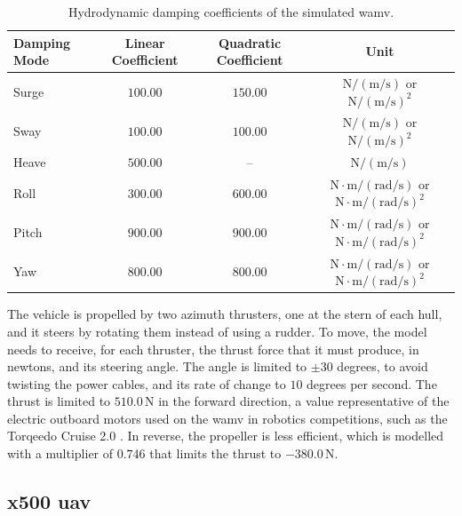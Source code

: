 \begin{table}[htbp]
    \centering
    \caption{Hydrodynamic damping coefficients of the simulated \gls{wamv}.}
    \label{tab:usv_damping_parameters}
    \begin{tabular}{lccc}
        \toprule
        \textbf{Damping Mode} & \textbf{Linear Coefficient} & \textbf{Quadratic Coefficient} & \textbf{Unit} \\
        \midrule
        Surge & $100.00$ & $150.00$ & $\text{N}/(\text{m/s})$ or $\text{N}/(\text{m/s})^2$ \\
        Sway & $100.00$ & $100.00$ & $\text{N}/(\text{m/s})$ or $\text{N}/(\text{m/s})^2$ \\
        Heave & $500.00$ & -- & $\text{N}/(\text{m/s})$ \\
        Roll & $300.00$ & $600.00$ & $\text{N}\cdot\text{m}/(\text{rad/s})$ or $\text{N}\cdot\text{m}/(\text{rad/s})^2$ \\
        Pitch & $900.00$ & $900.00$ & $\text{N}\cdot\text{m}/(\text{rad/s})$ or $\text{N}\cdot\text{m}/(\text{rad/s})^2$ \\
        Yaw & $800.00$ & $800.00$ & $\text{N}\cdot\text{m}/(\text{rad/s})$ or $\text{N}\cdot\text{m}/(\text{rad/s})^2$ \\
        \bottomrule
    \end{tabular}
\end{table}

The vehicle is propelled by two azimuth thrusters, one at the stern of each hull, and it steers by rotating them instead of using a rudder. To move, the model needs to receive, for each thruster, the thrust force that it must produce, in newtons, and its steering angle. The angle is limited to $\pm 30$ degrees, to avoid twisting the power cables, and its rate of change to $10$ degrees per second. The thrust is limited to $510.0\,\text{N}$ in the forward direction, a value representative of the electric outboard motors used on the \gls{wamv} in robotics competitions, such as the Torqeedo Cruise 2.0 \cite{torqeedo_cruise_manual}. In reverse, the propeller is less efficient, which is modelled with a multiplier of $0.746$ that limits the thrust to $-380.0\,\text{N}$.

\subsection{\texorpdfstring{x500 \Gls{uav}}{x500 UAV}}
\label{sec:x500_quadrotor}

